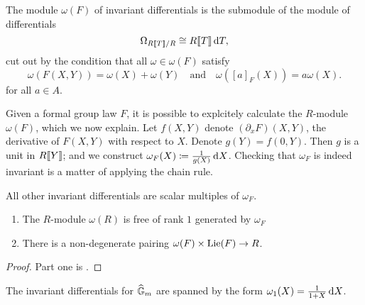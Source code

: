 \begin{defi}
  The module $\omega(F)$ of invariant differentials is the submodule of the module of 
  differentials
  \begin{equation*}
    \Omega_{R\llbracket T \rrbracket/R} \cong R\llbracket T \rrbracket \, \mathrm{d} T,
  \end{equation*}
  cut out by the condition that all $\omega \in \omega(F)$ satisfy 
  \begin{equation}\label{eq:diffcond}
    \omega(F(X,Y)) = \omega(X) + \omega(Y)\quad \text{and} \quad \omega([a]_F(X)) = a\omega(X).
  \end{equation} 
  for all $a \in A$. 
\end{defi}

Given a formal group law $F$, it is possible to explcitely calculate the
$R$-module $\omega(F)$, which we now explain. Let $f(X,Y)$ denote
$(\partial_x F)(X,Y)$, the derivative of $F(X,Y)$ with respect to $X$. Denote
$g(Y) = f(0,Y)$. Then $g$ is a unit in $R\llbracket Y \rrbracket$; and we construct
$\omega_F(X) \coloneqq \frac 1{g(X)} \, \mathrm{d} X$. Checking that $\omega_F$ is indeed
invariant is a matter of applying the chain rule.

All other invariant differentials are scalar multiples of $\omega_F$. 
\begin{prop}
  \begin{enumerate}
    \item The $R$-module $\omega(R)$ is free of rank $1$ generated by $\omega_F$ 
    \item There is a non-degenerate pairing $\omega(F) \times \operatorname{Lie}(F) \to R$.
  \end{enumerate}
\begin{proof}
  Part one is \cite[Proposition 2.2]{hopkins1994equivariant}. 
\end{proof}
\end{prop}

\begin{xpl}
  The invariant differentials for $\widehat{\mathbb{G}}_m$ are spanned by the form 
  $\omega_1(X) = \frac 1{1+X} \, \mathrm{d} X$. 
\end{xpl}

